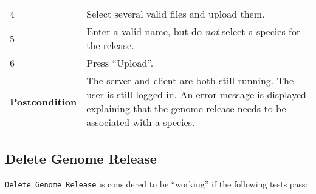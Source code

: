 \begin{longtable}[c]{@{}ll@{}}
\begin{minipage}[t]{0.31\columnwidth}
4
\strut\end{minipage} &
\begin{minipage}[t]{0.63\columnwidth}\raggedright\strut
Select several valid files and upload them.
\strut\end{minipage}\tabularnewline
\begin{minipage}[t]{0.31\columnwidth}\raggedright\strut
5
\strut\end{minipage} &
\begin{minipage}[t]{0.63\columnwidth}\raggedright\strut
Enter a valid name, but do \emph{not} select a species for the release.
\strut\end{minipage}\tabularnewline
\begin{minipage}[t]{0.31\columnwidth}\raggedright\strut
6
\strut\end{minipage} &
\begin{minipage}[t]{0.63\columnwidth}\raggedright\strut
Press ``Upload''.
\strut\end{minipage}\tabularnewline
\begin{minipage}[t]{0.31\columnwidth}\raggedright\strut
\textbf{Postcondition}
\strut\end{minipage} &
\begin{minipage}[t]{0.63\columnwidth}\raggedright\strut
The server and client are both still running. The user is still logged
in. An error message is displayed explaining that the genome release
needs to be associated with a species.
\strut\end{minipage}\tabularnewline
\bottomrule
\end{longtable}

\pagebreak

\subsection{Delete Genome Release}\label{delete-genome-release}

\texttt{Delete\ Genome\ Release} is considered to be ``working'' if the
following tests pass:

